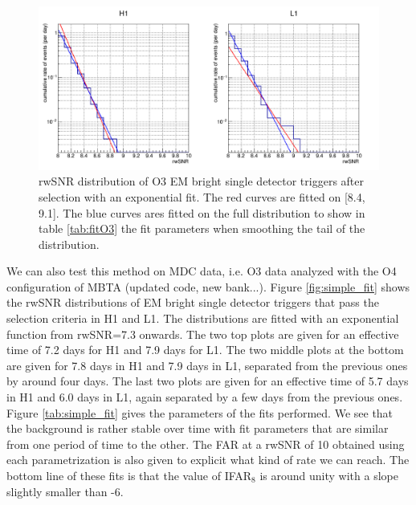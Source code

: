\begin{figure}
  \centering
  \includegraphics[width=\linewidth]{sectionFAR/simpleFit/cSimpleFitO3.png}
  \caption{rwSNR distribution of O3 EM bright single detector triggers after selection with an exponential fit. The red curves are fitted on [8.4, 9.1]. The blue curves ares fitted on the full distribution to show in table \ref{tab:fitO3} the fit parameters when smoothing the tail of the distribution.}
  \label{fig:fitO3}
\end{figure}

We can also test this method on MDC data, i.e. O3 data analyzed with the O4 configuration of MBTA (updated code, new bank...).
Figure \ref{fig:simple_fit} shows the rwSNR distributions of EM bright single detector triggers that pass the selection criteria in H1 and L1.
The distributions are fitted with an exponential function from rwSNR=7.3 onwards.
The two top plots are given for an effective time of 7.2 days for H1 and 7.9 days for L1.
The two middle plots at the bottom are given for 7.8 days in H1 and 7.9 days in L1, separated from the previous ones by around four days.
The last two plots are given for an effective time of 5.7 days in H1 and 6.0 days in L1, again separated by a few days from the previous ones.
Figure \ref{tab:simple_fit} gives the parameters of the fits performed.
We see that the background is rather stable over time with fit parameters that are similar from one period of time to the other.
The FAR at a rwSNR of 10 obtained using each parametrization is also given to explicit what kind of rate we can reach.
The bottom line of these fits is that the value of IFAR$_8$ is around unity with a slope slightly smaller than -6.

